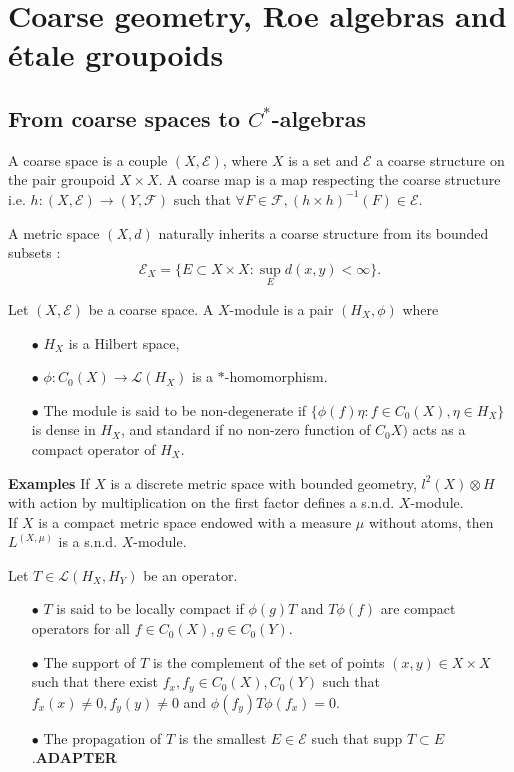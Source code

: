 \section{Coarse geometry, Roe algebras and étale groupoids}

\subsection{From coarse spaces to $C^*$-algebras}

\begin{definition}
A coarse space is a couple $(X,\mathcal E)$, where $X$ is a set and $\mathcal E$ a coarse structure on the pair groupoid $X\times X$. A coarse map is a map respecting the coarse structure i.e. $h : (X,\mathcal E)\rightarrow (Y,\mathcal F)$ such that $\forall F\in\mathcal F,(h\times h)^{-1}(F)\in \mathcal E$.
\end{definition}

A metric space $(X,d)$ naturally inherits a coarse structure from its bounded subsets :
\[\mathcal E_X = \{E\subset X\times X : \sup_{E} d(x,y)<\infty\}.\]

\begin{definition}
Let $(X,\mathcal E)$ be a coarse space. A $X$-module is a pair $(H_X,\phi )$ where 
\begin{itemize}
\item[$\bullet$] $H_X$ is a Hilbert space, 
\item[$\bullet$] $\phi : C_0(X)\rightarrow \mathcal L(H_X)$ is a $*$-homomorphism.
\item[$\bullet$] The module is said to be non-degenerate if $\{\phi(f)\eta : f\in C_0(X),\eta\in H_X\}$ is dense in $H_X$, and standard if no non-zero function of $C_0X)$ acts as a compact operator of $H_X$.
\end{itemize}
\end{definition}

\textbf{Examples} If $X$ is a discrete metric space with bounded geometry, $l^2(X)\otimes H$ with action by multiplication on the first factor defines a s.n.d. $X$-module.\\
If $X$ is a compact metric space endowed with a measure $\mu$ without atoms, then $L^(X,\mu)$ is a s.n.d. $X$-module.\\

\begin{definition}
Let $T\in \mathcal L(H_X, H_Y)$ be an operator.
\begin{itemize}
\item[$\bullet$] $T$ is said to be locally compact if $\phi(g)T$ and $T\phi(f)$ are compact operators for all $f\in C_0(X),g\in C_0(Y)$.
\item[$\bullet$] The support of $T$ is the complement of the set of points $(x,y)\in X\times X$ such that there exist $f_x,f_y\in C_0(X),C_0(Y)$ such that $f_x(x)\neq 0,f_{y}(y)\neq 0$ and $\phi(f_{y}) T \phi(f_x)=0$.
\item[$\bullet$] The propagation of $T$ is the smallest $E\in \mathcal E$ such that supp $T \subset E$.\textbf{ADAPTER}
\end{itemize}
\end{definition}

